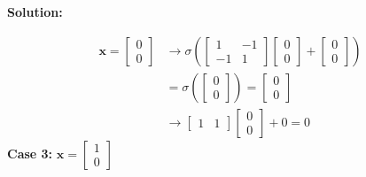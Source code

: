 \documentclass{article}
\newenvironment{solution}
  {\par\noindent\textbf{Solution:}\par}
  {\par}
\begin{document}
\begin{solution}
\[ 
\begin{aligned}
\mathbf{x}= \begin{bmatrix}
0 \\
0
\end{bmatrix} &\to \sigma(\begin{bmatrix}
1 & -1  \\
-1 & 1
\end{bmatrix}\begin{bmatrix}
0 \\
0
\end{bmatrix} + \begin{bmatrix}
0 \\
0
\end{bmatrix}) \\
&= \sigma(\begin{bmatrix}
0  \\
0
\end{bmatrix}) = \begin{bmatrix}
0 \\
0
\end{bmatrix} \\ 
&\to \begin{bmatrix}
1 & 1
\end{bmatrix}\begin{bmatrix}
0 \\
0
\end{bmatrix}+0 = 0
\end{aligned}
\]
\textbf{Case 3:} $\mathbf{x}= \begin{bmatrix}
1 \\
0
\end{bmatrix}$


\end{solution}
\end{document}

